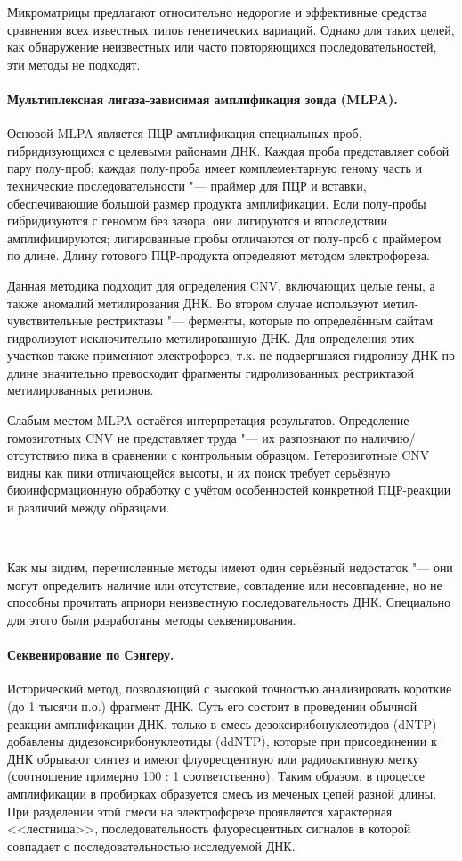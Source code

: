 \documentclass[a4paper,12pt]{article}
\begin{document}
Микроматрицы предлагают относительно недорогие и эффективные средства сравнения всех известных типов генетических вариаций.
Однако для таких целей, как обнаружение неизвестных или часто повторяющихся последовательностей, эти методы не подходят\cite{Gresham_2008}.

\paragraph{Мультиплексная лигаза-зависимая амплификация зонда (MLPA).}
Основой MLPA является ПЦР-амплификация специальных проб, гибридизующихся с целевыми районами ДНК.
Каждая проба представляет собой пару полу-проб;
каждая полу-проба имеет комплементарную геному часть и технические последовательности "--- праймер для ПЦР и вставки, обеспечивающие большой размер продукта амплификации.
Если полу-пробы гибридизуются с геномом без зазора, они лигируются и впоследствии амплифицируются;
лигированные пробы отличаются от полу-проб с праймером по длине.
Длину готового ПЦР-продукта определяют методом электрофореза.

Данная методика подходит для определения CNV, включающих целые гены, а также аномалий метилирования ДНК.
Во втором случае используют метил-чувствительные рестриктазы "--- ферменты, которые по определённым сайтам гидролизуют исключительно метилированную ДНК.
Для определения этих участков также применяют электрофорез, т.к. не подвергшаяся гидролизу ДНК по длине значительно превосходит фрагменты гидролизованных рестриктазой метилированных регионов.

Слабым местом MLPA остаётся интерпретация результатов.
Определение гомозиготных CNV не представляет труда "--- их разпознают по наличию/отсутствию пика в сравнении с контрольным образцом.
Гетерозиготные CNV видны как пики отличающейся высоты, и их поиск требует серьёзную биоинформационную обработку с учётом особенностей конкретной ПЦР-реакции и различий между образцами\cite{Stuppia_2012}.

~

Как мы видим, перечисленные методы имеют один серьёзный недостаток "--- они могут определить наличие или отсутствие, совпадение или несовпадение, но не способны прочитать априори неизвестную последовательность ДНК.
Специально для этого были разработаны методы секвенирования.

\paragraph{Секвенирование по Сэнгеру.}
Исторический метод, позволяющий с высокой точностью анализировать короткие (до 1 тысячи п.о.) фрагмент ДНК\cite{Sanger_1977}.
Суть его состоит в проведении обычной реакции амплификации ДНК, только в смесь дезоксирибонуклеотидов (dNTP) добавлены дидезоксирибонуклеотиды (ddNTP), которые при присоединении к ДНК обрывают синтез и имеют флуоресцентную или радиоактивную метку (соотношение примерно 100 : 1 соответственно).
Таким образом, в процессе амплификации в пробирках образуется смесь из меченых цепей разной длины.
При разделении этой смеси на электрофорезе проявляется характерная <<лестница>>, последовательность флуоресцентных сигналов в которой совпадает с последовательностью исследуемой ДНК.
\end{document}
